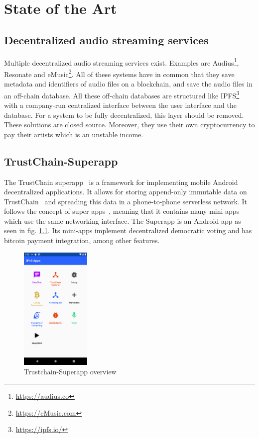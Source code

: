 \chapter{\label{chap:state-of-the-art}State of the Art}
\section{Decentralized audio streaming services}
Multiple decentralized audio streaming services exist. Examples are Audius\footnote{\url{https://audius.co}}, Resonate\cite{lindner2018investing} and eMusic\footnote{\url{https://eMusic.com}}. All of these systems have in common that they save metadata and identifiers of audio files on a blockchain, and save the audio files in an off-chain database. All these off-chain databases are structured like IPFS\footnote{\url{https://ipfs.io/}} with a company-run centralized interface between the user interface and the database. For a system to be fully decentralized, this layer should be removed. These solutions are closed source. Moreover, they use their own cryptocurrency to pay their artists which is an unstable income.

\section{TrustChain-Superapp}
\label{sec:sote-trustchain}
The TrustChain superapp~\citep{mattskala2020} is a framework for implementing mobile Android decentralized applications. It allows for storing append-only immutable data on TrustChain~\citep{otte2020trustchain} and spreading this data in a phone-to-phone serverless network. It follows the concept of super apps~\citep{kpmg2019superapps}, meaning that it contains many mini-apps which use the same networking interface. The Superapp is an Android app as seen in fig. \ref{fig:trustchain-superapp}. Its mini-apps implement decentralized democratic voting and has bitcoin payment integration, among other features.

\begin{figure}
    \includegraphics[width=0.3\textwidth]{implementation/screenshot-superapp.png}
    \caption{Trustchain-Superapp overview}
    \label{fig:trustchain-superapp}
\end{figure}

